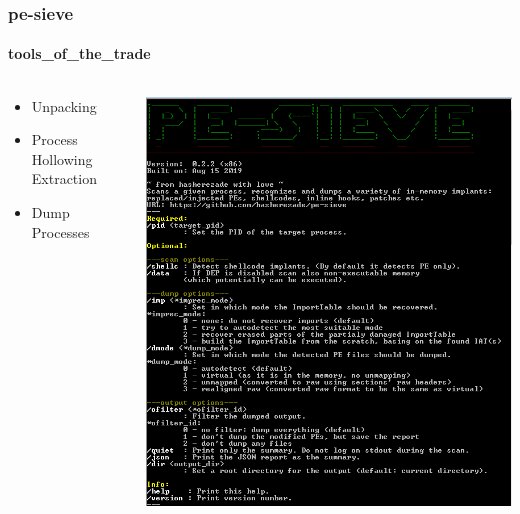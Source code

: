 \documentclass[aspectratio=169]{beamer}
\begin{document}
\begin{frame}
  \frametitle{pe-sieve}
  \framesubtitle{tools\_of\_the\_trade}
  \begin{columns}
    \begin{column}{.5\textwidth}
      \begin{itemize}
      \item{Unpacking}
      \item{Process Hollowing Extraction}
      \item{Dump Processes}
      \end{itemize}
    \end{column}
    \hfill
    \begin{column}{.5\textwidth}
      \includegraphics[scale=.28]{pe-sieve}
    \end{column}
  \end{columns}
\end{frame}
\end{document}
